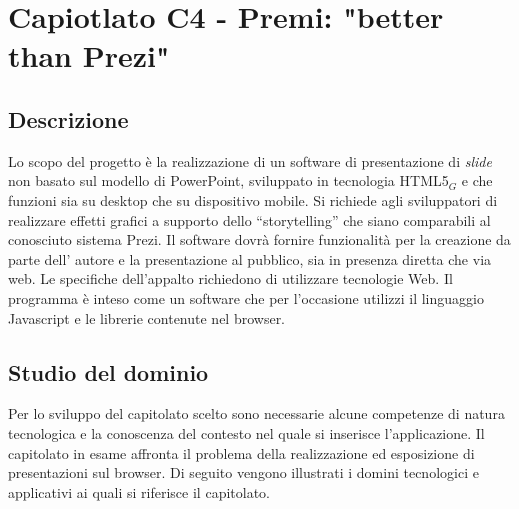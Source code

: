 \section{Capiotlato C4 - Premi: "better than Prezi"}
\subsection{Descrizione}
Lo scopo del progetto è la realizzazione di un software di presentazione di \textit{slide} non basato sul modello di PowerPoint, sviluppato in tecnologia HTML5$_{G}$ e che funzioni sia su desktop che su dispositivo mobile. Si richiede agli sviluppatori di realizzare effetti grafici a supporto dello ``storytelling'' che siano comparabili al conosciuto sistema Prezi. Il software dovrà fornire funzionalità per la creazione da parte dell' autore e la presentazione al pubblico, sia in presenza diretta che via web. Le specifiche dell'appalto richiedono di utilizzare tecnologie Web. Il programma è inteso come un software che per l'occasione utilizzi il linguaggio Javascript e le librerie contenute nel browser.

\subsection{Studio del dominio}
Per lo sviluppo del capitolato scelto sono necessarie alcune competenze di natura tecnologica e la conoscenza del contesto nel quale si inserisce l’applicazione. Il capitolato in esame affronta il problema della realizzazione ed esposizione di presentazioni sul browser. Di seguito vengono illustrati i domini tecnologici e applicativi ai quali si riferisce il capitolato.


